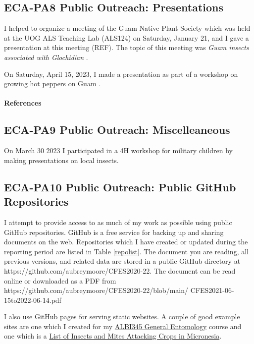 \subsection{ECA-PA8 Public Outreach: Presentations}
\begin{refsection}

I helped to organize a meeting of the Guam Native Plant Society which was held at the UOG ALS Teaching Lab (ALS124) on Saturday, January 21, and I gave a presentation at this meeting (REF). The topic of this meeting was \textit{Guam insects associated with \textit{Glochidian}} \cite{mooreGlochidion2023}.

On Saturday, April 15, 2023, I made a presentation as part of a workshop on growing hot peppers on Guam \cite{mooreInterestingFactsChili2023}.

\paragraph{References}
\printbibliography[heading=none]
\end{refsection}

\subsection{ECA-PA9 Public Outreach: Miscelleaneous}

On March 30 2023 I participated in a 4H workshop for military children by making presentations on local insects.

\subsection{ECA-PA10 Public Outreach: Public GitHub Repositories}

I attempt to provide access to as much of my work as possible using public GitHub repositories. GitHub is a free service for backing up and sharing documents on the web. Repositories which I have created or updated during the reporting period are listed in Table \ref{repolist}.  The document you
are reading, all previous versions, and related data are stored in a public GitHub directory
at
https://github.com/aubreymoore/CFES2020-22. The document can be read online or
downloaded as a PDF from
https://github.com/aubreymoore/CFES2020-22/blob/main/
CFES2021-06-15to2022-06-14.pdf

I also use GitHub pages for serving static websites. A couple of good example sites are one which I created for my \href{https://aubreymoore.github.io/ALBI-345/}{ALBI345 General Entomology} course and one which is a \href{https://aubreymoore.github.io/crop-pest-list/}{List of Insects and Mites Attacking Crops in Micronesia}.

